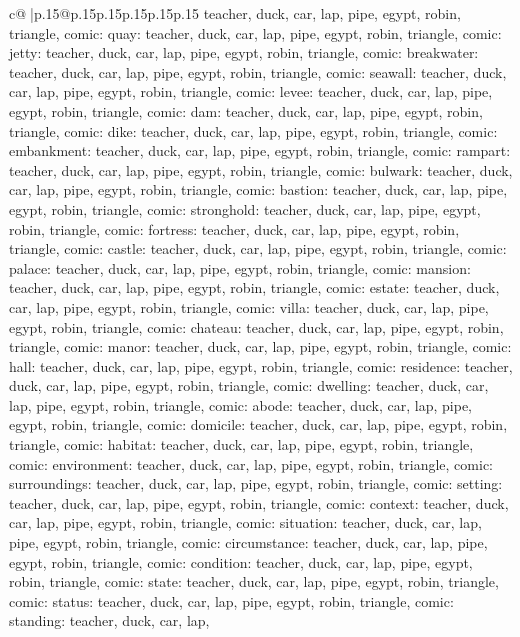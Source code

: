 \documentclass{article}
\begin{document}
{\begin{supertabular}{c@{$\;$}|p{.15\linewidth}@{}p{.15\linewidth}p{.15\linewidth}p{.15\linewidth}p{.15\linewidth}p{.15\linewidth}}
{{{teacher, duck, car, lap, pipe, egypt, robin, triangle, comic\n\nCLUE: quay\nTARGETS: teacher, duck, car, lap, pipe, egypt, robin, triangle, comic\n\nCLUE: jetty\nTARGETS: teacher, duck, car, lap, pipe, egypt, robin, triangle, comic\n\nCLUE: breakwater\nTARGETS: teacher, duck, car, lap, pipe, egypt, robin, triangle, comic\n\nCLUE: seawall\nTARGETS: teacher, duck, car, lap, pipe, egypt, robin, triangle, comic\n\nCLUE: levee\nTARGETS: teacher, duck, car, lap, pipe, egypt, robin, triangle, comic\n\nCLUE: dam\nTARGETS: teacher, duck, car, lap, pipe, egypt, robin, triangle, comic\n\nCLUE: dike\nTARGETS: teacher, duck, car, lap, pipe, egypt, robin, triangle, comic\n\nCLUE: embankment\nTARGETS: teacher, duck, car, lap, pipe, egypt, robin, triangle, comic\n\nCLUE: rampart\nTARGETS: teacher, duck, car, lap, pipe, egypt, robin, triangle, comic\n\nCLUE: bulwark\nTARGETS: teacher, duck, car, lap, pipe, egypt, robin, triangle, comic\n\nCLUE: bastion\nTARGETS: teacher, duck, car, lap, pipe, egypt, robin, triangle, comic\n\nCLUE: stronghold\nTARGETS: teacher, duck, car, lap, pipe, egypt, robin, triangle, comic\n\nCLUE: fortress\nTARGETS: teacher, duck, car, lap, pipe, egypt, robin, triangle, comic\n\nCLUE: castle\nTARGETS: teacher, duck, car, lap, pipe, egypt, robin, triangle, comic\n\nCLUE: palace\nTARGETS: teacher, duck, car, lap, pipe, egypt, robin, triangle, comic\n\nCLUE: mansion\nTARGETS: teacher, duck, car, lap, pipe, egypt, robin, triangle, comic\n\nCLUE: estate\nTARGETS: teacher, duck, car, lap, pipe, egypt, robin, triangle, comic\n\nCLUE: villa\nTARGETS: teacher, duck, car, lap, pipe, egypt, robin, triangle, comic\n\nCLUE: chateau\nTARGETS: teacher, duck, car, lap, pipe, egypt, robin, triangle, comic\n\nCLUE: manor\nTARGETS: teacher, duck, car, lap, pipe, egypt, robin, triangle, comic\n\nCLUE: hall\nTARGETS: teacher, duck, car, lap, pipe, egypt, robin, triangle, comic\n\nCLUE: residence\nTARGETS: teacher, duck, car, lap, pipe, egypt, robin, triangle, comic\n\nCLUE: dwelling\nTARGETS: teacher, duck, car, lap, pipe, egypt, robin, triangle, comic\n\nCLUE: abode\nTARGETS: teacher, duck, car, lap, pipe, egypt, robin, triangle, comic\n\nCLUE: domicile\nTARGETS: teacher, duck, car, lap, pipe, egypt, robin, triangle, comic\n\nCLUE: habitat\nTARGETS: teacher, duck, car, lap, pipe, egypt, robin, triangle, comic\n\nCLUE: environment\nTARGETS: teacher, duck, car, lap, pipe, egypt, robin, triangle, comic\n\nCLUE: surroundings\nTARGETS: teacher, duck, car, lap, pipe, egypt, robin, triangle, comic\n\nCLUE: setting\nTARGETS: teacher, duck, car, lap, pipe, egypt, robin, triangle, comic\n\nCLUE: context\nTARGETS: teacher, duck, car, lap, pipe, egypt, robin, triangle, comic\n\nCLUE: situation\nTARGETS: teacher, duck, car, lap, pipe, egypt, robin, triangle, comic\n\nCLUE: circumstance\nTARGETS: teacher, duck, car, lap, pipe, egypt, robin, triangle, comic\n\nCLUE: condition\nTARGETS: teacher, duck, car, lap, pipe, egypt, robin, triangle, comic\n\nCLUE: state\nTARGETS: teacher, duck, car, lap, pipe, egypt, robin, triangle, comic\n\nCLUE: status\nTARGETS: teacher, duck, car, lap, pipe, egypt, robin, triangle, comic\n\nCLUE: standing\nTARGETS: teacher, duck, car, lap, }}}
\end{supertabular}}
\end{document}

